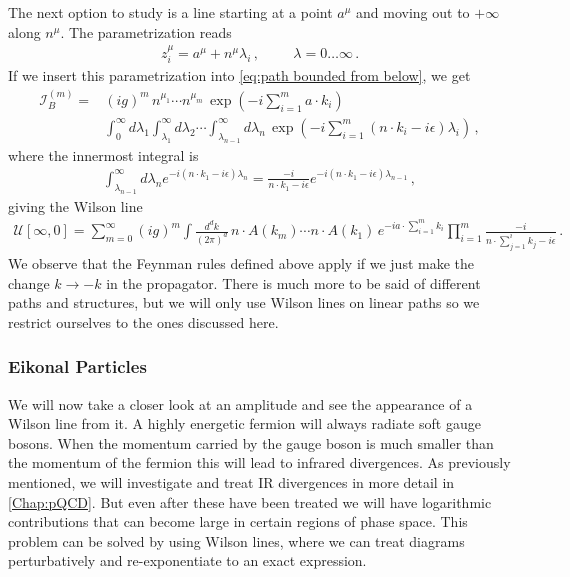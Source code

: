 The next option to study is a line starting at a point $a^{\mu}$ and moving out to $+\infty$ along $n^{\mu}$. The parametrization reads
\begin{align}
    z_{i}^{\mu}=a^{\mu}+n^{\mu}\lambda_{i}\,,\hspace{1cm}\lambda=0\dots\infty\,.
\end{align}
If we insert this parametrization into \cref{eq:path bounded from below}, we get
\begin{align}
    \mathcal{I}_{B}^{(m)}=&(ig)^{m}\,n^{\mu_1}\cdots n^{\mu_m}\,\exp(-i\sum_{i=1}^{m}a\cdot k_i)\nonumber
    \\
    &\int_{0}^{\infty}d\lambda_1\int_{\lambda_1}^{\infty}d\lambda_{2}\cdots\int_{\lambda_{n-1}}^{\infty}d\lambda_n \,\exp(-i\sum_{i=1}^{m}(n\cdot k_{i}-i\epsilon)\lambda_{i})\,,
\end{align}
where the innermost integral is 
\begin{align}
    \int_{\lambda_{n-1}}^{\infty}d\lambda_{n}e^{-i(n\cdot k_1-i\epsilon)\lambda_n}=\frac{-i}{n\cdot k_1-i\epsilon}e^{-i(n\cdot k_1-i\epsilon)\lambda_{n-1}}\,,
\end{align}
giving the Wilson line
\begin{align}\label{eq:semi-infinite Wilson line 0-to-infty}
    \mathcal{U}[\infty,0]=\sum_{m=0}^{\infty}(ig)^{m}\int\frac{d^{d}k}{(2\pi)^{d}}\,n\cdot A(k_m)\cdots n\cdot A(k_1)\,e^{-ia\cdot\sum_{i=1}^{m} k_i}\prod_{i=1}^{m}\frac{-i}{n\cdot\sum_{j=1}^{i} k_j-i\epsilon}\,.
\end{align}
We observe that the Feynman rules defined above apply if we just make the change $k\rightarrow -k$ in the propagator.  There is much more to be said of different paths and structures, but we will only use Wilson lines on linear paths so we restrict ourselves to the ones discussed here.

\subsubsection*{Eikonal Particles}
We will now take a closer look at an amplitude and see the appearance of a Wilson line from it. A highly energetic fermion will always radiate soft gauge bosons. When the momentum carried by the gauge boson is much smaller than the momentum of the fermion this will lead to infrared divergences. As previously mentioned, we will investigate and treat IR divergences in more detail in \cref{Chap:pQCD}. But even after these have been treated we will have logarithmic contributions that can become large in certain regions of phase space. This problem can be solved by using Wilson lines, where we can treat diagrams perturbatively and re-exponentiate to an exact expression.

